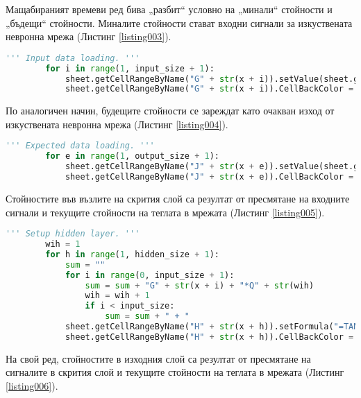 Мащабираният времеви ред бива „разбит“ условно на „минали“ стойности и „бъдещи“ стойности. Миналите стойности стават входни сигнали за изкуствената невронна мрежа (Листинг \ref{listing003}).

\begin{lstlisting}[caption=Формиране на входния слой, language=Python, basicstyle=\tiny, label=listing003]
        ''' Input data loading. '''
        for i in range(1, input_size + 1):
            sheet.getCellRangeByName("G" + str(x + i)).setValue(sheet.getCellRangeByName("E" + str(t + i)).getValue())
            sheet.getCellRangeByName("G" + str(x + i)).CellBackColor = (255 << 16 | 0 << 8 | 0)
\end{lstlisting}

По аналогичен начин, будещите стойности се зареждат като очакван изход от изкуствената невронна мрежа (Листинг \ref{listing004}).

\begin{lstlisting}[caption=Очакван изход от мрежата, language=Python, basicstyle=\tiny, label=listing004]
        ''' Expected data loading. '''
        for e in range(1, output_size + 1):
            sheet.getCellRangeByName("J" + str(x + e)).setValue(sheet.getCellRangeByName("E" + str(t + e + input_size)).getValue())
            sheet.getCellRangeByName("J" + str(x + e)).CellBackColor = (0 << 16 | 127 << 8 | 0)
\end{lstlisting}

Стойностите във възлите на скрития слой са резултат от пресмятане на входните сигнали и текущите стойности на теглата в мрежата (Листинг \ref{listing005}). 

\begin{lstlisting}[caption=Стойности на скрития слой при правия пас, language=Python, basicstyle=\tiny, label=listing005]
        ''' Setup hidden layer. '''
        wih = 1
        for h in range(1, hidden_size + 1):
            sum = ""
            for i in range(0, input_size + 1):
                sum = sum + "G" + str(x + i) + "*Q" + str(wih)
                wih = wih + 1
                if i < input_size:
                    sum = sum + " + "
            sheet.getCellRangeByName("H" + str(x + h)).setFormula("=TANH( " + sum + " )")
            sheet.getCellRangeByName("H" + str(x + h)).CellBackColor = (0 << 16 | 0 << 8 | 255)
\end{lstlisting}

На свой ред, стойностите в изходния слой са резултат от пресмятане на сигналите в скрития слой и текущите стойности на теглата в мрежата (Листинг \ref{listing006}).

